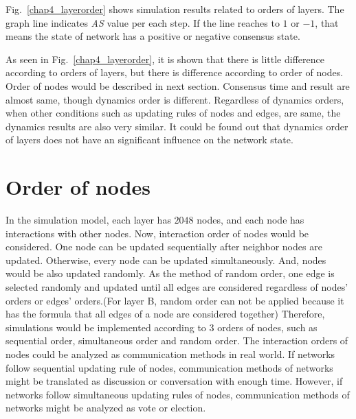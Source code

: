 Fig.~\ref{chap4_layerorder} shows simulation results related to orders of layers. The graph line indicates \textit{AS} value per each step. If the line reaches to $1$ or $-1$, that means the state of network has a positive or negative consensus state.

As seen in Fig.~\ref{chap4_layerorder}, it is shown that there is little difference according to orders of layers, but there is difference according to order of nodes. Order of nodes would be described in next section. Consensus time and result are almost same, though dynamics order is different. Regardless of dynamics orders, when other conditions such as updating rules of nodes and edges, are same, the dynamics results are also very similar. It could be found out that dynamics order of layers does not have an significant influence on the network state. \\

\section{Order of nodes}
In the simulation model, each layer has $2048$ nodes, and each node has interactions with other nodes. Now, interaction order of nodes would be considered. One node can be updated sequentially after neighbor nodes are updated. Otherwise, every node can be updated simultaneously. And, nodes would be also updated randomly. As the method of random order, one edge is selected randomly and updated until all edges are considered regardless of nodes' orders or edges' orders.(For layer B, random order can not be applied because it has the formula that all edges of a node are considered together) Therefore, simulations would be implemented according to $3$ orders of nodes, such as sequential order, simultaneous order and random order. The interaction orders of nodes could be analyzed as communication methods in real world. If networks follow sequential updating rule of nodes, communication methods of networks might be translated as discussion or conversation with enough time. However, if networks follow simultaneous updating rules of nodes, communication methods of networks might be analyzed as vote or election.

